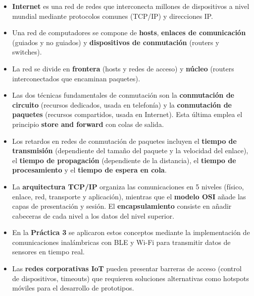 \begin{itemize}
    \item \textbf{Internet} es una red de redes que interconecta millones de dispositivos a nivel mundial mediante protocolos comunes (TCP/IP) y direcciones IP.
    \item Una red de computadores se compone de \textbf{hosts}, \textbf{enlaces de comunicación} (guiados y no guiados) y \textbf{dispositivos de conmutación} (routers y switches).
    \item La red se divide en \textbf{frontera} (hosts y redes de acceso) y \textbf{núcleo} (routers interconectados que encaminan paquetes).
    \item Las dos técnicas fundamentales de conmutación son la \textbf{conmutación de circuito} (recursos dedicados, usada en telefonía) y la \textbf{conmutación de paquetes} (recursos compartidos, usada en Internet). Esta última emplea el principio \textbf{store and forward} con colas de salida.
    \item Los retardos en redes de conmutación de paquetes incluyen el \textbf{tiempo de transmisión} (dependiente del tamaño del paquete y la velocidad del enlace), el \textbf{tiempo de propagación} (dependiente de la distancia), el \textbf{tiempo de procesamiento} y el \textbf{tiempo de espera en cola}.
    \item La \textbf{arquitectura TCP/IP} organiza las comunicaciones en 5 niveles (físico, enlace, red, transporte y aplicación), mientras que el \textbf{modelo OSI} añade las capas de presentación y sesión. El \textbf{encapsulamiento} consiste en añadir cabeceras de cada nivel a los datos del nivel superior.
    \item En la \textbf{Práctica 3} se aplicaron estos conceptos mediante la implementación de comunicaciones inalámbricas con BLE y Wi-Fi para transmitir datos de sensores en tiempo real.
    \item Las \textbf{redes corporativas IoT} pueden presentar barreras de acceso (control de dispositivos, timeouts) que requieren soluciones alternativas como hotspots móviles para el desarrollo de prototipos.
\end{itemize}
